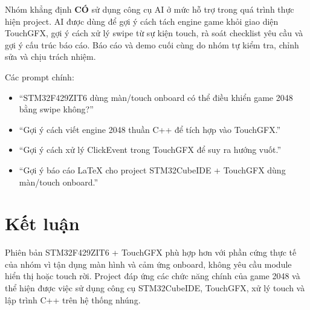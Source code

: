 \documentclass[12pt,a4paper]{article}
\begin{document}
Nhóm khẳng định \textbf{CÓ} sử dụng công cụ AI ở mức hỗ trợ trong quá trình thực hiện project. AI được dùng để gợi ý cách tách engine game khỏi giao diện TouchGFX, gợi ý cách xử lý swipe từ sự kiện touch, rà soát checklist yêu cầu và gợi ý cấu trúc báo cáo. Báo cáo và demo cuối cùng do nhóm tự kiểm tra, chỉnh sửa và chịu trách nhiệm.

Các prompt chính:

\begin{itemize}
    \item ``STM32F429ZIT6 dùng màn/touch onboard có thể điều khiển game 2048 bằng swipe không?''
    \item ``Gợi ý cách viết engine 2048 thuần C++ để tích hợp vào TouchGFX.''
    \item ``Gợi ý cách xử lý ClickEvent trong TouchGFX để suy ra hướng vuốt.''
    \item ``Gợi ý báo cáo LaTeX cho project STM32CubeIDE + TouchGFX dùng màn/touch onboard.''
\end{itemize}

\section{Kết luận}

Phiên bản STM32F429ZIT6 + TouchGFX phù hợp hơn với phần cứng thực tế của nhóm vì tận dụng màn hình và cảm ứng onboard, không yêu cầu module hiển thị hoặc touch rời. Project đáp ứng các chức năng chính của game 2048 và thể hiện được việc sử dụng công cụ STM32CubeIDE, TouchGFX, xử lý touch và lập trình C++ trên hệ thống nhúng.
\end{document}
